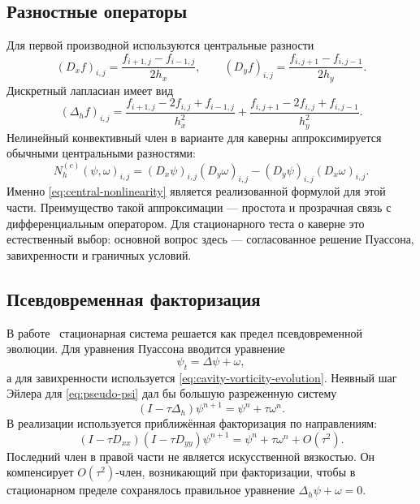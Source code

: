 \documentclass[12pt,a4paper]{article}
\newcommand{\Laplace}{\Delta}
\begin{document}
\subsection{Разностные операторы}

Для первой производной используются центральные разности
\begin{equation}
    (D_x f)_{i,j}=\frac{f_{i+1,j}-f_{i-1,j}}{2h_x},
    \qquad
    (D_y f)_{i,j}=\frac{f_{i,j+1}-f_{i,j-1}}{2h_y}.
    \label{eq:central-first}
\end{equation}
Дискретный лапласиан имеет вид
\begin{equation}
    (\Laplace_h f)_{i,j}
    =
    \frac{f_{i+1,j}-2f_{i,j}+f_{i-1,j}}{h_x^2}
    +
    \frac{f_{i,j+1}-2f_{i,j}+f_{i,j-1}}{h_y^2}.
    \label{eq:discrete-laplacian}
\end{equation}
Нелинейный конвективный член в варианте для каверны аппроксимируется обычными центральными разностями:
\begin{equation}
    N_h^{(c)}(\psi,\omega)_{i,j}
    =
    (D_x\psi)_{i,j}(D_y\omega)_{i,j}
    -
    (D_y\psi)_{i,j}(D_x\omega)_{i,j}.
    \label{eq:central-nonlinearity}
\end{equation}
Именно \eqref{eq:central-nonlinearity} является реализованной формулой для этой части.
Преимущество такой аппроксимации --- простота и прозрачная связь с дифференциальным оператором.
Для стационарного теста о каверне это естественный выбор: основной вопрос здесь --- согласованное решение Пуассона, завихренности и граничных условий.

\subsection{Псевдовременная факторизация}

В работе~\cite{erturk2005} стационарная система решается как предел псевдовременной эволюции.
Для уравнения Пуассона вводится уравнение
\begin{equation}
    \psi_t=\Laplace\psi+\omega,
    \label{eq:pseudo-psi}
\end{equation}
а для завихренности используется \eqref{eq:cavity-vorticity-evolution}.
Неявный шаг Эйлера для \eqref{eq:pseudo-psi} дал бы большую разреженную систему
\[
    (I-\tau\Laplace_h)\psi^{n+1}=\psi^n+\tau\omega^n.
\]
В реализации используется приближённая факторизация по направлениям:
\begin{equation}
    (I-\tau D_{xx})(I-\tau D_{yy})\psi^{n+1}
    =
    \psi^n+\tau\omega^n
    +
    O(\tau^2).
    \label{eq:psi-factorized}
\end{equation}
Последний член в правой части не является искусственной вязкостью.
Он компенсирует \(O(\tau^2)\)-член, возникающий при факторизации, чтобы в стационарном пределе сохранялось правильное уравнение \(\Laplace_h\psi+\omega=0\).
\end{document}
